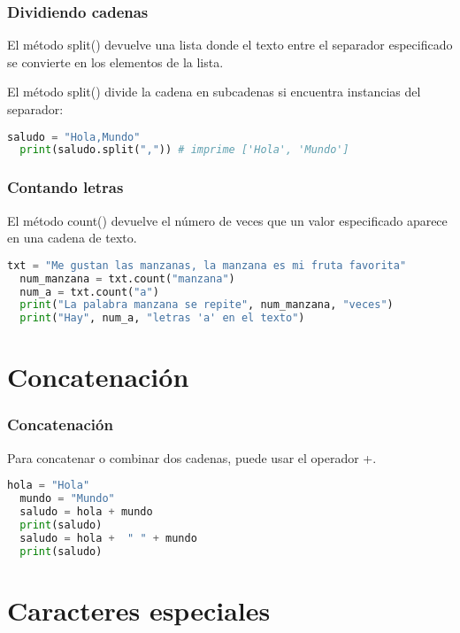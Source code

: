 \begin{frame}[fragile]
  \frametitle{Dividiendo cadenas}

  El método \textcolor{codeKeyword}{split}() devuelve una lista donde
  el texto entre el separador especificado se convierte en los elementos
  de la lista.

  \vspace{\baselineskip}
  El método \textcolor{codeKeyword}{split}() divide la cadena en
  subcadenas si encuentra instancias del separador:
  \begin{lstlisting}[language=Python]
  saludo = "Hola,Mundo"
  print(saludo.split(",")) # imprime ['Hola', 'Mundo']
  \end{lstlisting}
\end{frame}

\begin{frame}[fragile]
  \frametitle{Contando letras}

  El método \textcolor{codeKeyword}{count}() devuelve el número de veces que
  un valor especificado aparece en una cadena de texto.

  \vspace{\baselineskip}
  \begin{lstlisting}[language=Python]
  txt = "Me gustan las manzanas, la manzana es mi fruta favorita"
  num_manzana = txt.count("manzana")
  num_a = txt.count("a")
  print("La palabra manzana se repite", num_manzana, "veces")
  print("Hay", num_a, "letras 'a' en el texto")
  \end{lstlisting}
\end{frame}

\section{Concatenación}

\begin{frame}[fragile]
  \frametitle{Concatenación}

  Para concatenar o combinar dos cadenas, puede usar el operador +.

  \begin{lstlisting}[language=Python]
  hola = "Hola"
  mundo = "Mundo"
  saludo = hola + mundo
  print(saludo)
  saludo = hola +  " " + mundo
  print(saludo)
  \end{lstlisting}
\end{frame}


\section{Caracteres especiales}

